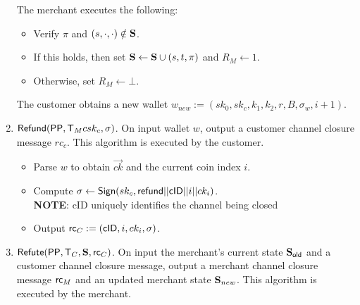 \documentclass[11pt]{report}
\begin{document}
\begin{enumerate}
\medskip \noindent
The merchant executes the following:
\begin{itemize}
\item Verify $\pi$ and $(s,\cdot, \cdot) \notin {\bf S}$.
\item If this holds, then set ${\bf S} \leftarrow {\bf S}  \cup (s, t, \pi)$ and $R_{M} \leftarrow 1$.
\item Otherwise, set $R_{M} \leftarrow \bot$.
\end{itemize}

\medskip \noindent
The customer obtains a new wallet $w_{new} := (sk_0, sk_c, k_1, k_2, r, B, \sigma_w, i+1)$.

\item ${\sf Refund}({\sf PP}, {\sf T}_{M} csk_c, \sigma)$. On input wallet $w$, output a customer channel closure message $rc_c$. This algorithm is executed by the customer.
\begin{itemize}
\item Parse $w$ to obtain $\vec{ck}$ and the current coin index $i$.
\item Compute $\sigma \leftarrow {\sf Sign}(sk_c, {\sf refund}||{\sf cID}||i||ck_i)$.
\\	{\bf NOTE}: {\sf cID} uniquely identifies the channel being closed
\item Output ${\sf rc}_{C} := ({\sf cID}, i, ck_i, \sigma)$.
\end{itemize}

\item ${\sf Refute}({\sf PP}, {\sf T}_{C}, {\bf S}, {\sf rc}_{C})$. On input the merchant's current state ${\bf S}_{\sf old}$ and a customer channel closure message, output a merchant channel closure message ${\sf rc}_{M}$ and an updated merchant state ${\bf S}_{new}$. This algorithm is executed by the merchant.


\end{enumerate}
\end{document}
